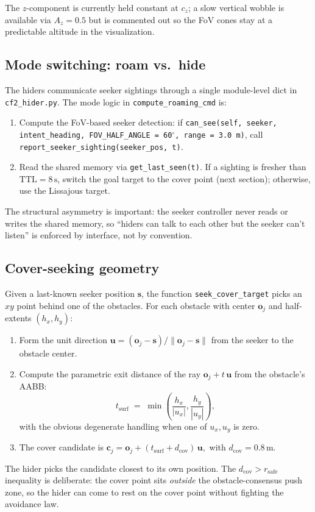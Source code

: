 \documentclass[11pt,a4paper]{article}
\newcommand{\code}[1]{\texttt{#1}}
\newcommand{\vect}[1]{\mathbf{#1}}
\begin{document}
The $z$-component is currently held constant at $c_z$; a slow vertical wobble
is available via $A_z = 0.5$ but is commented out so the FoV cones stay at a
predictable altitude in the visualization.

\subsection{Mode switching: roam vs.\ hide}

The hiders communicate seeker sightings through a single module-level dict in
\code{cf2\_hider.py}. The mode logic in \code{compute\_roaming\_cmd} is:
\begin{enumerate}[leftmargin=1.4em]
  \item Compute the FoV-based seeker detection: if \code{can\_see(self,
        seeker, intent\_heading, FOV\_HALF\_ANGLE = 60$^\circ$, range = 3.0\,m)},
        call \code{report\_seeker\_sighting(seeker\_pos, t)}.
  \item Read the shared memory via \code{get\_last\_seen(t)}. If a sighting
        is fresher than $\text{TTL} = 8\,\text{s}$, switch the goal target
        to the cover point (next section); otherwise, use the Lissajous
        target.
\end{enumerate}
The structural asymmetry is important: the seeker controller never reads or
writes the shared memory, so ``hiders can talk to each other but the seeker
can't listen'' is enforced by interface, not by convention.

\subsection{Cover-seeking geometry}
\label{sec:cover}

Given a last-known seeker position $\vect{s}$, the function
\code{seek\_cover\_target} picks an $xy$ point behind one of the obstacles.
For each obstacle with center $\vect{o}_j$ and half-extents $(h_x, h_y)$:
\begin{enumerate}[leftmargin=1.4em]
  \item Form the unit direction $\vect{u} = (\vect{o}_j - \vect{s})/\|\vect{o}_j -
        \vect{s}\|$ from the seeker to the obstacle center.
  \item Compute the parametric exit distance of the ray
        $\vect{o}_j + t\,\vect{u}$ from the obstacle's AABB:
        \[
            t_\mathrm{surf} \;=\; \min\!\left( \frac{h_x}{|u_x|},
                                               \frac{h_y}{|u_y|} \right),
        \]
        with the obvious degenerate handling when one of $u_x, u_y$ is zero.
  \item The cover candidate is
        \(
            \vect{c}_j = \vect{o}_j + (t_\mathrm{surf} + d_\mathrm{cov})\,\vect{u},
        \)
        with $d_\mathrm{cov} = 0.8\,\text{m}$.
\end{enumerate}
The hider picks the candidate closest to its own position. The
$d_\mathrm{cov} > r_\mathrm{safe}$ inequality is deliberate: the cover point
sits \emph{outside} the obstacle-consensus push zone, so the hider can come
to rest on the cover point without fighting the avoidance law.
\end{document}
